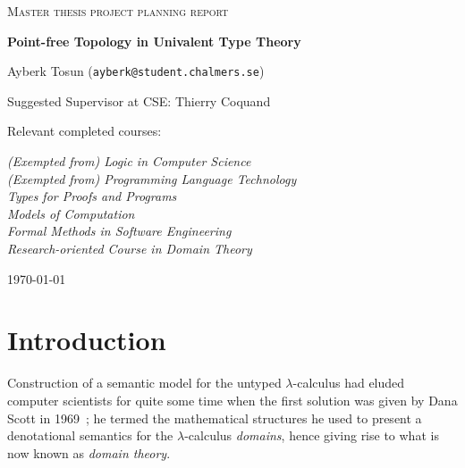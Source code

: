 \documentclass{article}
\begin{document}
\begin{titlepage}

\centering
  
{\scshape\LARGE Master thesis project planning report\\}
  
\vspace{0.5cm}
  
{\huge\bfseries Point-free Topology in Univalent Type Theory\\}
  
\vspace{2cm}
  
{\Large Ayberk Tosun (\texttt{ayberk@student.chalmers.se})\\}
  
\vspace{1.0cm}
  
{\large Suggested Supervisor at CSE: Thierry Coquand\\}
  
\vspace{1.5cm}
  
{\large Relevant completed courses:\\}
  
{\itshape (Exempted from) Logic in Computer Science\\}
{\itshape (Exempted from) Programming Language Technology\\}
{\itshape Types for Proofs and Programs\\}
{\itshape Models of Computation\\}
{\itshape Formal Methods in Software Engineering\\}
{\itshape Research-oriented Course in Domain Theory\\}
  
\vfill

\vfill
  
{\large \today\\} 

\end{titlepage}

\section{Introduction}

Construction of a semantic model for the untyped $\lambda$-calculus had eluded computer
scientists for quite some time when the first solution was given by Dana Scott in
1969~\cite{scott:1969}; he termed the mathematical structures he used to present a
denotational semantics for the $\lambda$-calculus \emph{domains}, hence giving rise to what is
now known as \emph{domain theory}.
\end{document}
